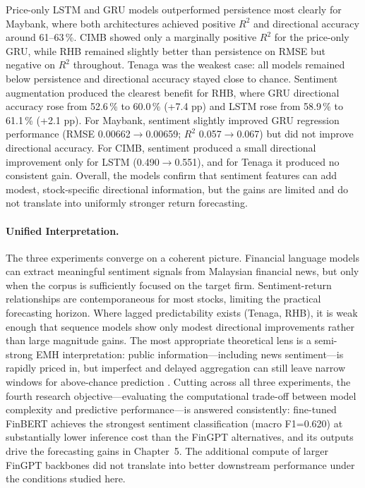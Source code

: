 \documentclass[12pt]{ucetd}
\begin{document}
Price-only LSTM and GRU models outperformed persistence most clearly for Maybank, where both architectures achieved positive $R^2$ and directional accuracy around 61--63\,\%. CIMB showed only a marginally positive $R^2$ for the price-only GRU, while RHB remained slightly better than persistence on RMSE but negative on $R^2$ throughout. Tenaga was the weakest case: all models remained below persistence and directional accuracy stayed close to chance. Sentiment augmentation produced the clearest benefit for RHB, where GRU directional accuracy rose from 52.6\,\% to 60.0\,\% (+7.4 pp) and LSTM rose from 58.9\,\% to 61.1\,\% (+2.1 pp). For Maybank, sentiment slightly improved GRU regression performance (RMSE 0.00662$\to$0.00659; $R^2$ 0.057$\to$0.067) but did not improve directional accuracy. For CIMB, sentiment produced a small directional improvement only for LSTM (0.490$\to$0.551), and for Tenaga it produced no consistent gain. Overall, the models confirm that sentiment features can add modest, stock-specific directional information, but the gains are limited and do not translate into uniformly stronger return forecasting.

\paragraph{Unified Interpretation.}
The three experiments converge on a coherent picture. Financial language models can extract meaningful sentiment signals from Malaysian financial news, but only when the corpus is sufficiently focused on the target firm. Sentiment-return relationships are contemporaneous for most stocks, limiting the practical forecasting horizon. Where lagged predictability exists (Tenaga, RHB), it is weak enough that sequence models show only modest directional improvements rather than large magnitude gains. The most appropriate theoretical lens is a semi-strong EMH interpretation: public information---including news sentiment---is rapidly priced in, but imperfect and delayed aggregation can still leave narrow windows for above-chance prediction \cite{tetlock2007giving, bollen2011twitter, davidovic2025news}. Cutting across all three experiments, the fourth research objective---evaluating the computational trade-off between model complexity and predictive performance---is answered consistently: fine-tuned FinBERT achieves the strongest sentiment classification (macro F1=0.620) at substantially lower inference cost than the FinGPT alternatives, and its outputs drive the forecasting gains in Chapter~5. The additional compute of larger FinGPT backbones did not translate into better downstream performance under the conditions studied here.
\end{document}
